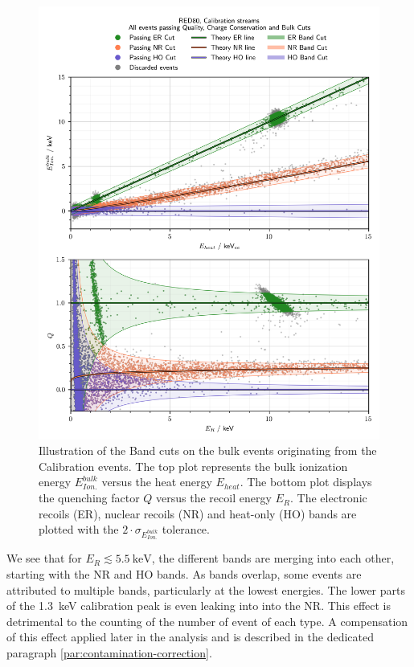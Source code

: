 \begin{figure}
\centering
\includegraphics[scale=1]{Figures/Neutron/band_cuts.png}
\caption{Illustration of the Band cuts on the bulk events originating from the Calibration events. The top plot represents the bulk ionization energy $E_{Ion.}^{bulk}$ versus the heat energy $E_{heat}$. The bottom plot displays the quenching factor $Q$ versus the recoil energy $E_R$. The electronic recoils (ER), nuclear recoils (NR) and heat-only (HO) bands are plotted with the $2 \cdot \sigma_{E_{Ion.}^{bulk}}$ tolerance.}
\label{fig:band-cuts}
\end{figure}

We see that for $E_R \lesssim \SI{5.5}{\kilo\eV}$, the different bands are merging into each other, starting with the NR and HO bands. As bands overlap, some events are attributed to multiple bands, particularly at the lowest energies. The lower parts of the \SI{1.3}{\kilo\eV} calibration peak is even leaking into into the NR. This effect is detrimental to the counting of the number of event of each type. A compensation of this effect applied later in the analysis and is described in the dedicated paragraph \ref{par:contamination-correction}.

